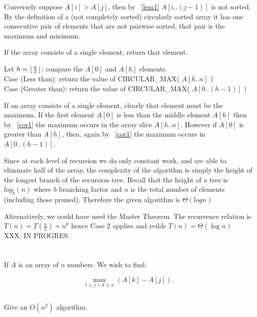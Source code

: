 \documentclass{amsart}
\theoremstyle{definition}
\theoremstyle{remark}
\numberwithin{equation}{section}
\DeclarePairedDelimiter{\floor}{\lfloor}{\rfloor}
\begin{document}
Conversely suppose $A[i] > A[j]$, then by ~\ref{lem1} $A[i..(j-1)]$ is
not sorted. By the definition of a (not completely sorted) circularly
sorted array it has one consecutive pair of elements that are not
pairwise sorted, that pair is the maximum and minimum.


If the array consists of a single element, return that element.

Let $h = \floor{ \frac{n}{2} }$; compare the $A[0]$ and $A[h]$ elements. \\

Case (Less than): return the value of CIRCULAR\_MAX( $A[h..n]$ ) \\

Case (Greater than): return the value of CIRCULAR\_MAX( $A[0..(h-1)]$ ) \\

\proof

If an array consists of a single element, clearly that element must
be the maximum. If the first element $A[0]$ is less than the middle
element $A[h]$ then by ~\ref{cor1} the maximum occurs in the array slice
$A[h..n]$. However if $A[0]$ is greater than $A[h]$, then, again by
~\ref{cor1} the maximum occurs in $A[0..(h-1)]$.


\proof

Since at each level of recursion we do only constant work, and are able
to eliminate half of the array, the complexity of the algorithm is
simply the height of the longest branch of the recursion tree. Recall
that the height of a tree is $log_{b} (n)$ where $b$ branching factor
and $n$ is the total number of elements (including those pruned).
Therefore the given algorithm is $\Theta( log n )$

Alternatively, we could have used the Master Theorem. The recurrence
relation is $T(n) = T(\frac{n}{2}) + n^0$ hence Case 2 applies and
yeilds $T(n) = \Theta (\log n)$
\\


XXX: IN PROGRES
\section{} If $A$ is an array of $n$ numbers. We wish to find:

$$ \max_{1 \leq j<k \leq n} (A[k] - A[j]).$$

\subsection{} Give an $O( n^2 )$ algorithm.
\end{document}
